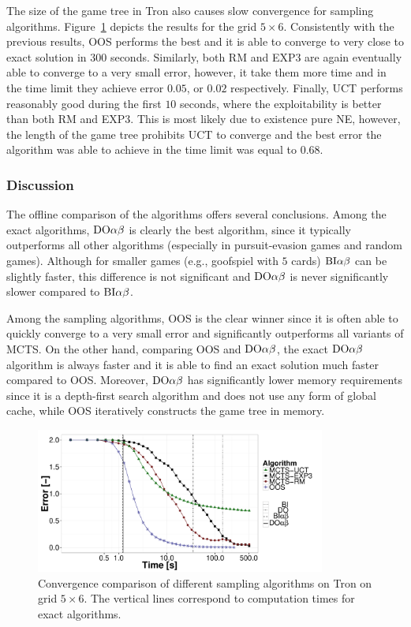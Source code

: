 The size of the game tree in Tron also causes slow convergence for sampling algorithms.
Figure~\ref{fig:off:conv:tron} depicts the results for the grid $5\times6$.
Consistently with the previous results, OOS performs the best and it is able to converge to very close to exact solution in $300$ seconds. 
Similarly, both RM and EXP3 are again eventually able to converge to a very small error, however, it take them more time and in the time limit they achieve error $0.05$, or $0.02$ respectively. 
Finally, UCT performs reasonably good during the first $10$ seconds, where the exploitability is better than both RM and EXP3. 
This is most likely due to existence pure NE, however, the length of the game tree prohibits UCT to converge and the best error the algorithm was able to achieve in the time limit was equal to $0.68$.

\subsubsection{Discussion}
The offline comparison of the algorithms offers several conclusions.
Among the exact algorithms, $\textrm{DO}\alpha\beta$ is clearly the best algorithm, since it typically outperforms all other algorithms (especially in pursuit-evasion games and random games). Although for smaller games (e.g., goofspiel with $5$ cards)  $\textrm{BI}\alpha\beta$ can be slightly faster, this difference is not significant and $\textrm{DO}\alpha\beta$ is never significantly slower compared to $\textrm{BI}\alpha\beta$.

Among the sampling algorithms, OOS is the clear winner since it is often able to quickly converge to a very small error and significantly outperforms all variants of MCTS.
On the other hand, comparing OOS and $\textrm{DO}\alpha\beta$, the exact $\textrm{DO}\alpha\beta$ algorithm is always faster and it is able to find an exact solution much faster compared to OOS.
Moreover, $\textrm{DO}\alpha\beta$ has significantly lower memory requirements since it is a depth-first search algorithm and does not use any form of global cache, while OOS iteratively constructs the game tree in memory.

\begin{figure}
\centering
\includegraphics[width=0.85\textwidth]{figures/convergence-tron.pdf}
\caption{Convergence comparison of different sampling algorithms on Tron on grid $5\times6$. The vertical lines correspond to computation times for exact algorithms.} \label{fig:off:conv:tron}
\end{figure}


